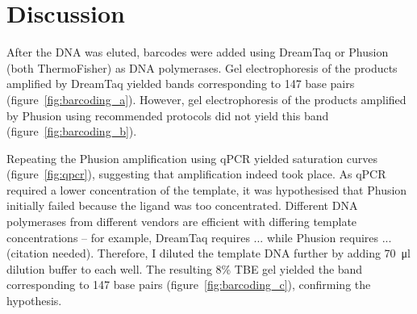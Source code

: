 \documentclass[parskip=full, numbers=noenddot]{scrreprt}
\begin{document}

\section{Discussion}
\label{sec:emsaselex_discussion}



After the DNA was eluted, barcodes were added using DreamTaq or Phusion (both ThermoFisher) as DNA polymerases.  Gel electrophoresis of the products amplified by DreamTaq yielded bands corresponding to 147 base pairs (figure~\ref{fig:barcoding_a}).  However, gel electrophoresis of the products amplified by Phusion using recommended protocols did not yield this band (figure~\ref{fig:barcoding_b}).

Repeating the Phusion amplification using qPCR yielded saturation curves (figure~\ref{fig:qpcr}), suggesting that amplification indeed took place.  As qPCR required a lower concentration of the template, it was hypothesised that Phusion initially failed because the ligand was too concentrated.  Different DNA polymerases from different vendors are efficient with differing template concentrations – for example, DreamTaq requires ... while Phusion requires ... (citation needed).  Therefore, I diluted the template DNA further by adding \SI{70}{\micro\litre} dilution buffer to each well. The resulting 8\% TBE gel yielded the band corresponding to 147 base pairs (figure~\ref{fig:barcoding_c}), confirming the hypothesis.
\end{document}
